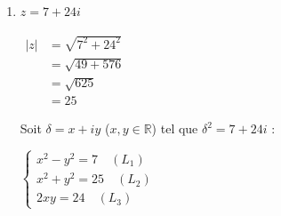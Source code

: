 \documentclass[12pt,a4paper]{article}
\begin{document}
\begin{enumerate}
\begin{enumerate}
        Soit $\delta = x + iy$ ($x, y \in \mathbb{R}$) tel que $\delta^2 = -5 + 12i$ :
        
        $
        \begin{cases}
            x^2 - y^2 = -5 \quad (L_1) \\
            x^2 + y^2 = 13 \quad (L_2) \\
            2xy = 12 \quad (L_3)
        \end{cases}
        $
        
        $
        \begin{aligned}
            (L_1) + (L_2) &\implies 2x^2 = 8\\
            &\implies x^2 = 4\\
            &\implies x = 2 \text{ ou } x = -2
        \end{aligned}
        $
        
        $
        \begin{aligned}
            (L_2) - (L_1) &\implies 2y^2 = 18\\
            &\implies y^2 = 9\\
            &\implies y = 3 \text{ ou } y = -3
        \end{aligned}
        $
        
        $
        \begin{aligned}
            (L_3) &\implies xy = 6 > 0
        \end{aligned}
        $
        
        Donc $x$ et $y$ sont de même signe. Les racines carrées de $-5 + 12i$ sont donc $\mathbf{2 + 3i}$ et $\mathbf{-2 - 3i}$.

        \item $z = 7 + 24i$
        
        $
        \begin{aligned}
            |z| &= \sqrt{7^2 + 24^2}\\
            &= \sqrt{49 + 576}\\
            &= \sqrt{625}\\
            &= 25
        \end{aligned}
        $
        
        Soit $\delta = x + iy$ ($x, y \in \mathbb{R}$) tel que $\delta^2 = 7 + 24i$ :
        
        $
        \begin{cases}
            x^2 - y^2 = 7 \quad (L_1) \\
            x^2 + y^2 = 25 \quad (L_2) \\
            2xy = 24 \quad (L_3)
        \end{cases}
        $
        

\end{enumerate}
\end{enumerate}
\end{document}
